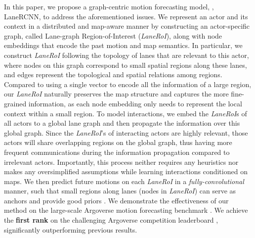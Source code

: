 In this paper, we propose a graph-centric motion forecasting model, \ie, LaneRCNN, 
to address the aforementioned issues. 
We represent an actor and its context 
in a distributed and map-aware manner by 
constructing an actor-specific graph, called Lane-graph Region-of-Interest (\textit{LaneRoI}), along with node 
embeddings that encode the past motion and map semantics. 
In particular, we construct  \textit{LaneRoI} following the topology 
of lanes that are relevant to this actor, where nodes on this graph correspond
to small spatial regions along these lanes, and edges represent the topological and spatial relations among regions. 
Compared to using a single vector to encode all the information of a large region, our \textit{LaneRoI} naturally
preserves the map structure and captures the more fine-grained information, 
as each node embedding only needs to represent the local context within a small
region. 
To model interactions, we embed the \textit{LaneRoI}s of all actors to
a global lane graph  and then propagate the information over this global graph.
Since the \textit{LaneRoI}'s of interacting actors are highly relevant, those actors will
share overlapping regions on the global graph, thus having more frequent
communications during the information propagation compared to 
irrelevant actors. 
Importantly, this process neither requires any heuristics nor makes any oversimplified
assumptions while learning interactions conditioned on maps. 
We then predict future motions on each
\textit{LaneRoI} in a \emph{fully-convolutional} manner, such that small regions along
lanes (nodes in \textit{LaneRoI}) can serve as anchors and provide good priors
. We demonstrate the effectiveness of our method on the
large-scale Argoverse motion forecasting benchmark \cite{argoverse}. We achieve
the \textbf{first rank} on the challenging Argoverse competition leaderboard
\cite{argoleaderboard}, significantly
outperforming previous results.





















